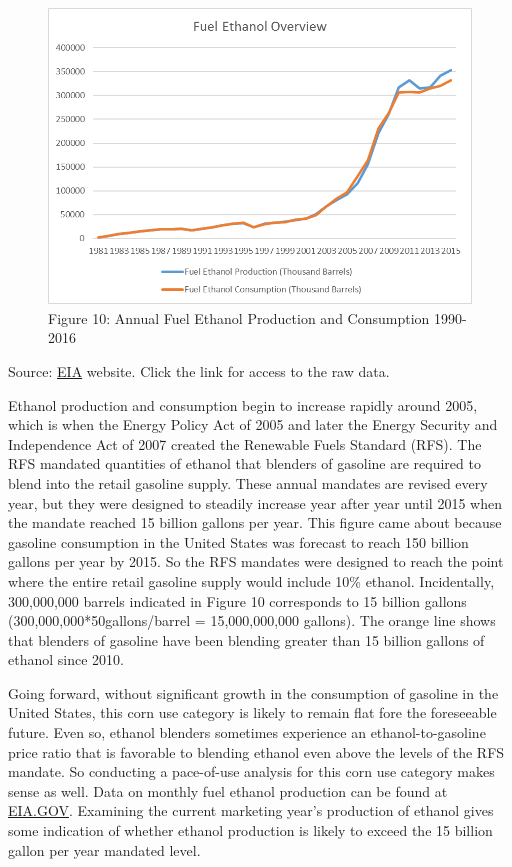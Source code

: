 \documentclass[]{book}
\theoremstyle{definition}
\theoremstyle{definition}
\theoremstyle{remark}
\begin{document}
\begin{figure}[htbp]
\centering
\includegraphics{Excel-files/Forecastinguseof_Fuel_Ethanol_Overview_files/image001.png}
\caption{Figure 10: Annual Fuel Ethanol Production and Consumption
1990-2016}
\end{figure}

Source:
\href{http://www.eia.gov/totalenergy/data/monthly/\#renewable}{EIA}
website. Click the link for access to the raw data.

Ethanol production and consumption begin to increase rapidly around
2005, which is when the Energy Policy Act of 2005 and later the Energy
Security and Independence Act of 2007 created the Renewable Fuels
Standard (RFS). The RFS mandated quantities of ethanol that blenders of
gasoline are required to blend into the retail gasoline supply. These
annual mandates are revised every year, but they were designed to
steadily increase year after year until 2015 when the mandate reached 15
billion gallons per year. This figure came about because gasoline
consumption in the United States was forecast to reach 150 billion
gallons per year by 2015. So the RFS mandates were designed to reach the
point where the entire retail gasoline supply would include 10\%
ethanol. Incidentally, 300,000,000 barrels indicated in Figure 10
corresponds to 15 billion gallons (300,000,000*50gallons/barrel =
15,000,000,000 gallons). The orange line shows that blenders of gasoline
have been blending greater than 15 billion gallons of ethanol since
2010.

Going forward, without significant growth in the consumption of gasoline
in the United States, this corn use category is likely to remain flat
fore the foreseeable future. Even so, ethanol blenders sometimes
experience an ethanol-to-gasoline price ratio that is favorable to
blending ethanol even above the levels of the RFS mandate. So conducting
a pace-of-use analysis for this corn use category makes sense as well.
Data on monthly fuel ethanol production can be found at
\href{http://www.eia.gov/totalenergy/data/monthly/\#renewable}{EIA.GOV}.
Examining the current marketing year's production of ethanol gives some
indication of whether ethanol production is likely to exceed the 15
billion gallon per year mandated level.
\end{document}
